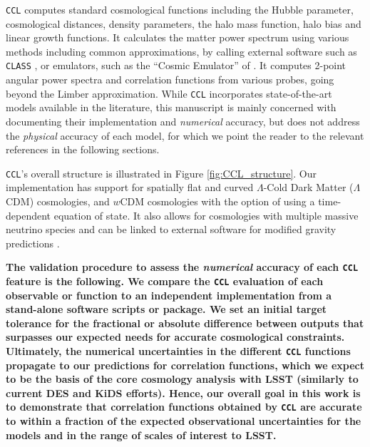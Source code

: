 \documentclass[\docopts]{\docclass}
\newcommand{\ccl}{{\tt CCL}\xspace}
\begin{document}
\ccl computes standard cosmological functions including the Hubble parameter, cosmological distances, density parameters, the halo mass function, halo bias and linear growth functions. It calculates the matter power spectrum using various methods including common approximations, by calling external software such as {\tt CLASS} \citep{class}, or emulators, such as the ``Cosmic Emulator'' of \citet{Lawrence17}. It computes 2-point angular power spectra and correlation functions from various probes, going beyond the Limber approximation. While \ccl incorporates state-of-the-art models available in the literature, this manuscript is mainly concerned with documenting their implementation and {\it numerical} accuracy, but does not address the {\it physical} accuracy of each model, for which we point the reader to the relevant references in the following sections.

\ccl 's overall structure is illustrated in Figure \ref{fig:CCL_structure}. Our implementation has support for spatially flat and curved $\Lambda$-Cold Dark Matter ($\Lambda$CDM) cosmologies, and $w$CDM cosmologies with the option of using a time-dependent equation of state. It also allows for cosmologies with multiple massive neutrino species and can be linked to external software for modified gravity predictions \citep[{\tt hi$\_$CLASS},][]{Zumalacarregui17}.

{\bf The validation procedure to assess the {\it numerical} accuracy of each \ccl feature is the following. We compare the \ccl evaluation of each observable or function to an independent implementation from a stand-alone software scripts or package. We set an initial target tolerance for the fractional or absolute difference between outputs that surpasses our expected needs for accurate cosmological constraints. Ultimately, the numerical uncertainties in the different \ccl functions propagate to our predictions for correlation functions, which we expect to be the basis of the core cosmology analysis with LSST (similarly to current DES and KiDS efforts). Hence, our overall goal in this work is to demonstrate that correlation functions obtained by \ccl are accurate to within a fraction of the expected observational uncertainties for the models and in the range of scales of interest to LSST.}
\end{document}
